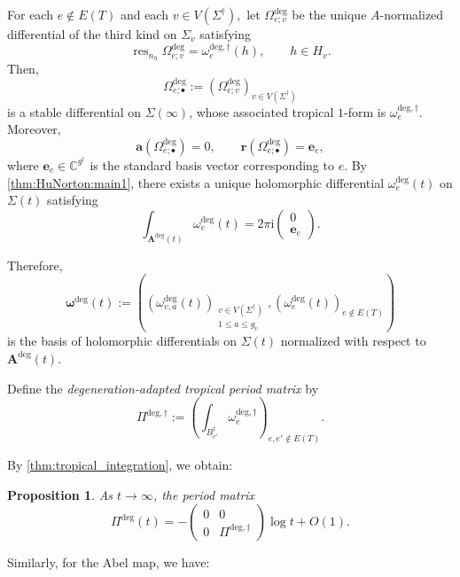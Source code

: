 \documentclass[12pt]{amsart}
\numberwithin{equation}{section}
\newtheorem{proposition}[theorem]{Proposition}
\theoremstyle{definition}
\newcommand{\C}{\mathbb{C}}
\def\vertices{V}
\def\edges{E}
\def\res{\operatorname{res}}
\def\trop{\dagger}
\def\imunit{{\mathrm{i}}}
\def\mcurve{\Sigma}
\def\tropmcurve{\mcurve^\trop}
\begin{document}
For each
$
e \notin \edges(T)
$
and each
$
v\in\vertices(\tropmcurve),
$
let $\Omega_{e;v}^{\mathrm{deg}}$ be the unique $A$-normalized
differential of the third kind on $\mcurve_v$ satisfying
\[
\res_{n_h}\Omega_{e;v}^{\mathrm{deg}}
=
\omega_e^{\mathrm{deg},\trop}(h),
\qquad
h\in H_v.
\]
Then,
\[
\Omega_{e;\bullet}^{\mathrm{deg}}
:=
(
\Omega_{e;v}^{\mathrm{deg}}
)_{v\in\vertices(\tropmcurve)}
\]
is a stable differential on $\mcurve(\infty)$, whose associated
tropical $1$-form is
$
\omega_e^{\mathrm{deg},\trop}.
$
Moreover,
\[
\bm a(\Omega_{e;\bullet}^{\mathrm{deg}})
=
0,
\qquad
\bm r(\Omega_{e;\bullet}^{\mathrm{deg}})
=
\bm e_e,
\]
where $\bm e_e\in\C^{g^\trop}$ is the standard basis vector
corresponding to $e$. By
\cref{thm:HuNorton:main1}, there exists a unique holomorphic differential
$
\omega_e^{\mathrm{deg}}(t)
$
on $\mcurve(t)$ satisfying
\[
\int_{\bm A^{\mathrm{deg}}(t)}
\omega_e^{\mathrm{deg}}(t)
=
2\pi\imunit
\begin{pmatrix}
0\\
\bm e_e
\end{pmatrix}.
\]

Therefore,
\[
\bm\omega^{\mathrm{deg}}(t)
:=
\left(
(
\omega_{v,a}^{\mathrm{deg}}(t)
)_{
\substack{
v\in\vertices(\tropmcurve)\\
1\leq a\leq g_v
}},
(
\omega_e^{\mathrm{deg}}(t)
)_{e\notin\edges(T)}
\right)
\]
is the basis of holomorphic differentials on $\mcurve(t)$ normalized
with respect to $\bm A^{\mathrm{deg}}(t)$.

Define the \emph{degeneration-adapted tropical period matrix} by
\[
\Pi^{\mathrm{deg},\trop}
:=
\left(
\int_{B_{e'}^\trop}
\omega_e^{\mathrm{deg},\trop}
\right)_{
e,e'\notin\edges(T)
}.
\]

By \cref{thm:tropical_integration}, we obtain:

\begin{proposition}
\label{cor:periodtropical}
As \(t\to\infty\), the period matrix
\begin{equation}
\Pi^{\mathrm{deg}}(t)
=
-
\begin{pmatrix}
0&0\\
0&\Pi^{\mathrm{deg},\trop}
\end{pmatrix}
\log t
+
O(1).
\label{eq:period_asympotics_ov}
\end{equation}
\end{proposition}

Similarly, for the Abel map, we have:
\end{document}
